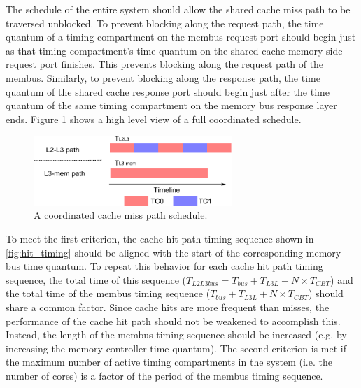 The schedule of the entire system should allow the shared cache miss path to be 
traversed unblocked.
To prevent blocking along the request path, the time quantum of a timing 
compartment on the membus request port should begin just as that timing 
compartment's time quantum on the shared cache memory side request port 
finishes. This prevents blocking along the request path of the membus.
Similarly, to prevent blocking along the response path, the time quantum of the 
shared cache response port should begin just after the time quantum of the same 
timing compartment on the memory bus response layer ends. Figure 
\ref{fig:coordination}
shows a high level view of a full coordinated schedule.

\begin{figure}
    \begin{center}
        \includegraphics[width=2.9475in]{figs/coordination.pdf}
        \caption{A coordinated cache miss path schedule.}
        \label{fig:coordination}
    \end{center}
\end{figure}

To meet the first criterion, the cache hit path timing sequence shown in 
\ref{fig:hit_timing} should be aligned with the start of the corresponding 
memory bus time quantum. To repeat this behavior for each cache hit path timing 
sequence, the total time of this sequence ($T_{L2L3bus}=T_{bus}+T_{L3L}+N\times T_{CBT}$)
and the total time of the membus timing sequence
($T_{bus}+T_{L3L}+N\times T_{CBT}$) should share a common factor. Since cache 
hits are more frequent than misses, the performance of the cache hit path 
should not be weakened to accomplish this. Instead, the length of the membus 
timing sequence should be increased (e.g. by increasing the memory controller 
time quantum). The second criterion is met if the maximum number of active 
timing compartments in the system (i.e. the number of cores) is a factor of the 
period of the membus timing sequence.
